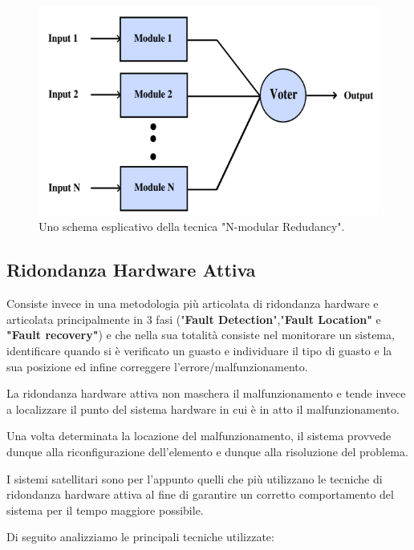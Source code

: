 \documentclass[LaM,binding=0.6cm,oneside]{../sapthesis}
\begin{document}
\begin{itemize}
    \begin{figure}[htbp]
    \centerline{\includegraphics[scale=.67]{examples/NModularRedudancy.PNG}}
    \caption{Uno schema esplicativo della tecnica "N-modular Redudancy".}
    \label{fig}
    \end{figure}
\newline
\end{itemize}

\newpage
\subsection{Ridondanza Hardware Attiva}

Consiste invece in una metodologia più articolata di ridondanza hardware e articolata principalmente in 3 fasi ("\textbf{Fault Detection}","\textbf{Fault Location"} e \textbf{"Fault recovery"}) e che nella sua totalità consiste nel monitorare un sistema, identificare quando si è verificato un guasto e individuare il tipo di guasto e la sua posizione ed infine correggere l'errore/malfunzionamento.

La ridondanza hardware attiva non maschera il malfunzionamento e tende invece a localizzare il punto del sistema hardware in cui è in atto il malfunzionamento. 

Una volta determinata la locazione del malfunzionamento, il sistema provvede dunque alla riconfigurazione dell'elemento e dunque alla risoluzione del problema.

I sistemi satellitari sono per l'appunto quelli che più utilizzano le tecniche di ridondanza hardware attiva al fine di garantire un corretto comportamento del sistema per il tempo maggiore possibile.

Di seguito analizziamo le principali tecniche utilizzate:
\end{document}
